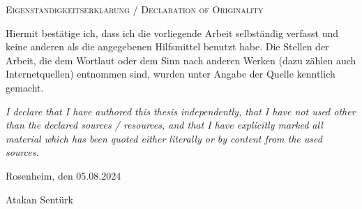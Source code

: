 {
\large
\thispagestyle{empty}
\vspace*{\fill}

\noindent
\textsc{Eigenständigkeitserklärung / Declaration of Originality}

\medskip

\noindent
Hiermit bestätige ich, dass ich die vorliegende Arbeit selbständig verfasst und keine anderen als die angegebenen Hilfsmittel benutzt habe. Die Stellen der Arbeit, die dem Wortlaut oder dem Sinn nach anderen Werken (dazu zählen auch Internetquellen) entnommen sind, wurden unter Angabe der Quelle kenntlich gemacht.

\medskip

\textit{I declare that I have authored this thesis independently, that I have not used other than the declared sources / resources, and that I have explicitly marked all material which has been quoted either literally or by content from the used sources.}

\bigskip

\noindent
Rosenheim, den 05.08.2024

\vspace*{2cm}

\noindent
Atakan Sentürk
}

